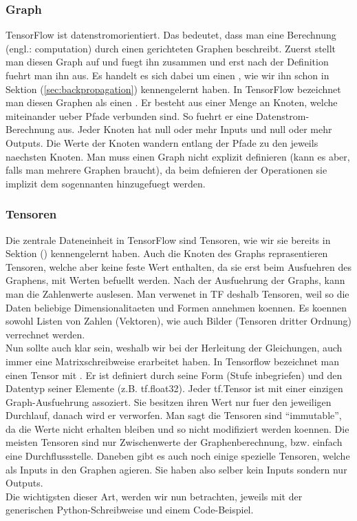 \subsubsection{Graph}
TensorFlow ist datenstromorientiert. Das bedeutet, dass man eine Berechnung
(engl.: computation) durch einen gerichteten Graphen beschreibt. Zuerst stellt
man diesen Graph auf und fuegt ihn zusammen und erst nach der Definition fuehrt man
ihn aus.
Es handelt es sich dabei um einen , wie wir ihn schon in Sektion (\ref{sec:backpropagation}) kennengelernt
haben. In TensorFlow bezeichnet man diesen Graphen als einen .
\para{}
Er besteht aus einer Menge an Knoten, welche miteinander ueber Pfade
verbunden sind. So fuehrt er eine Datenstrom-Berechnung aus. Jeder Knoten hat
null oder mehr Inputs und null oder mehr Outputs. Die Werte der Knoten wandern
entlang der Pfade zu den jeweils naechsten Knoten.
\para{}
Man muss einen Graph nicht explizit definieren (kann es aber, falls man mehrere
Graphen braucht), da beim defnieren der Operationen sie implizit dem
sogennanten  hinzugefuegt werden.

\subsubsection{Tensoren}
Die zentrale Dateneinheit in TensorFlow sind Tensoren, wie wir sie bereits in
Sektion () kennengelernt haben.
Auch die Knoten des Graphs reprasentieren Tensoren, welche aber keine feste Wert
enthalten, da sie erst beim Ausfuehren des Graphens, mit Werten befuellt werden.
Nach der Ausfuehrung der Graphs, kann man die Zahlenwerte auslesen.
\para{}
Man verwenet in TF deshalb Tensoren, weil so die Daten beliebige Dimensionalitaeten
und Formen annehmen koennen. Es koennen sowohl Listen von Zahlen (Vektoren),
wie auch Bilder (Tensoren dritter Ordnung) verrechnet werden. \\
Nun sollte auch klar sein, weshalb wir bei der Herleitung der Gleichungen, auch
immer eine Matrixschreibweise erarbeitet haben.
\para{}
In Tensorflow bezeichnet man einen Tensor mit .
Er ist definiert durch seine Form (Stufe inbegriefen) und den Datentyp seiner
Elemente (z.B. tf.float32).
\para{}
Jeder tf.Tensor ist mit einer einzigen Graph-Ausfuehrung assoziert. Sie
besitzen ihren Wert nur fuer den jeweiligen Durchlauf, danach wird er verworfen.
Man sagt die Tensoren sind ``immutable'', da die Werte nicht erhalten bleiben
und so nicht modifiziert werden koennen.
\para{}
Die meisten Tensoren sind nur Zwischenwerte der Graphenberechnung, bzw. einfach
eine Durchflussstelle. Daneben gibt es auch noch einige spezielle Tensoren,
welche als Inputs in den Graphen agieren. Sie haben also selber kein Inputs
sondern nur Outputs. \\
Die wichtigsten dieser Art, werden wir nun betrachten, jeweils mit der
generischen Python-Schreibweise und einem Code-Beispiel.

